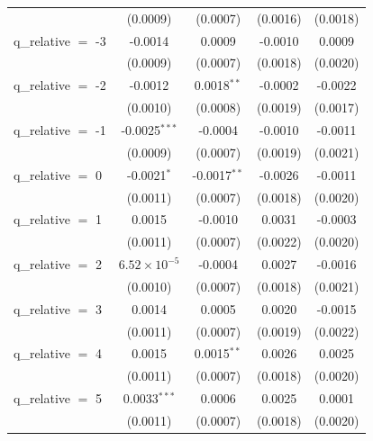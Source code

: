 \begin{tabular}{lcccc}
                        & (0.0009)              & (0.0007)               & (0.0016)      & (0.0018)\\   
   q\_relative $=$ -3   & -0.0014               & 0.0009                 & -0.0010       & 0.0009\\   
                        & (0.0009)              & (0.0007)               & (0.0018)      & (0.0020)\\   
   q\_relative $=$ -2   & -0.0012               & 0.0018$^{**}$          & -0.0002       & -0.0022\\   
                        & (0.0010)              & (0.0008)               & (0.0019)      & (0.0017)\\   
   q\_relative $=$ -1   & -0.0025$^{***}$       & -0.0004                & -0.0010       & -0.0011\\   
                        & (0.0009)              & (0.0007)               & (0.0019)      & (0.0021)\\   
   q\_relative $=$ 0    & -0.0021$^{*}$         & -0.0017$^{**}$         & -0.0026       & -0.0011\\   
                        & (0.0011)              & (0.0007)               & (0.0018)      & (0.0020)\\   
   q\_relative $=$ 1    & 0.0015                & -0.0010                & 0.0031        & -0.0003\\   
                        & (0.0011)              & (0.0007)               & (0.0022)      & (0.0020)\\   
   q\_relative $=$ 2    & $6.52\times 10^{-5}$  & -0.0004                & 0.0027        & -0.0016\\   
                        & (0.0010)              & (0.0007)               & (0.0018)      & (0.0021)\\   
   q\_relative $=$ 3    & 0.0014                & 0.0005                 & 0.0020        & -0.0015\\   
                        & (0.0011)              & (0.0007)               & (0.0019)      & (0.0022)\\   
   q\_relative $=$ 4    & 0.0015                & 0.0015$^{**}$          & 0.0026        & 0.0025\\   
                        & (0.0011)              & (0.0007)               & (0.0018)      & (0.0020)\\   
   q\_relative $=$ 5    & 0.0033$^{***}$        & 0.0006                 & 0.0025        & 0.0001\\   
                        & (0.0011)              & (0.0007)               & (0.0018)      & (0.0020)\\   

\end{tabular}
